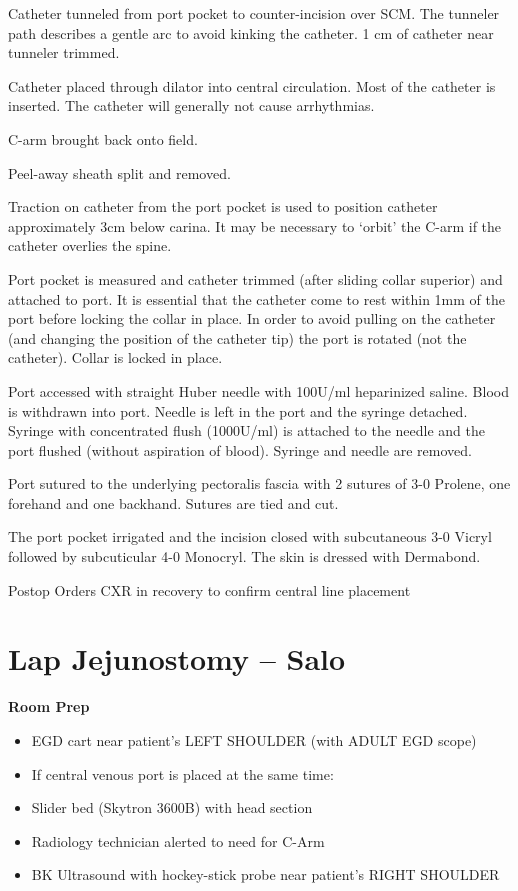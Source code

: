\documentclass[
]{book}
\providecommand{\tightlist}{%
  \setlength{\itemsep}{0pt}\setlength{\parskip}{0pt}}
\begin{document}
Catheter tunneled from port pocket to counter-incision over SCM. The tunneler path describes a gentle arc to avoid kinking the catheter. 1 cm of catheter near tunneler trimmed.

Catheter placed through dilator into central circulation. Most of the catheter is inserted. The catheter will generally not cause arrhythmias.

C-arm brought back onto field.

Peel-away sheath split and removed.

Traction on catheter from the port pocket is used to position catheter approximately 3cm below carina. It may be necessary to `orbit' the C-arm if the catheter overlies the spine.

Port pocket is measured and catheter trimmed (after sliding collar superior) and attached to port. It is essential that the catheter come to rest within 1mm of the port before locking the collar in place. In order to avoid pulling on the catheter (and changing the position of the catheter tip) the port is rotated (not the catheter). Collar is locked in place.

Port accessed with straight Huber needle with 100U/ml heparinized saline. Blood is withdrawn into port. Needle is left in the port and the syringe detached. Syringe with concentrated flush (1000U/ml) is attached to the needle and the port flushed (without aspiration of blood). Syringe and needle are removed.

Port sutured to the underlying pectoralis fascia with 2 sutures of 3-0 Prolene, one forehand and one backhand. Sutures are tied and cut.

The port pocket irrigated and the incision closed with subcutaneous 3-0 Vicryl followed by subcuticular 4-0 Monocryl. The skin is dressed with Dermabond.

Postop Orders
CXR in recovery to confirm central line placement

\hypertarget{lap-jejunostomy-salo}{%
\chapter{Lap Jejunostomy -- Salo}\label{lap-jejunostomy-salo}}

\textbf{Room Prep}

\begin{itemize}
\tightlist
\item
  EGD cart near patient's LEFT SHOULDER (with ADULT EGD scope)
\item
  If central venous port is placed at the same time:
\item
  Slider bed (Skytron 3600B) with head section
\item
  Radiology technician alerted to need for C-Arm
\item
  BK Ultrasound with hockey-stick probe near patient's RIGHT SHOULDER
\end{itemize}
\end{document}
